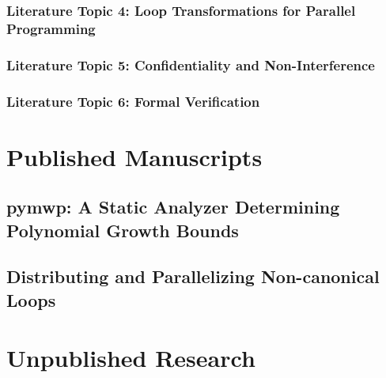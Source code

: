         \subsection{Literature Topic 4: Loop Transformations for Parallel
        Programming}\label{transforms}
        

        \subsection{Literature Topic 5: Confidentiality and Non-Interference}
        \label{pl-sec}
        

        \subsection{Literature Topic 6: Formal Verification}
        \label{verification}
        

\chapter{Published Manuscripts}\label{published-manuscripts}
\clearpage

    \section{pymwp: A Static Analyzer Determining Polynomial Growth Bounds}
    \label{sec:atva}
    
    \clearpage

    \section{Distributing and Parallelizing Non-canonical Loops}
    \label{sec:vmcai}
    
    \clearpage

\chapter{Unpublished Research}\label{ch:unpublished-research}
\clearpage

